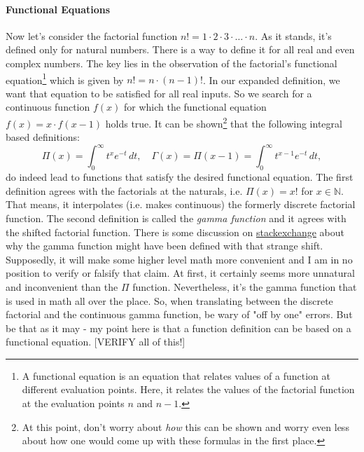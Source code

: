 


\paragraph{Functional Equations}
Now let's consider the factorial function $n! = 1 \cdot 2 \cdot 3 \cdot \ldots \cdot n$. As it stands, it's defined only for natural numbers. There is a way to define it for all real and even complex numbers. The key lies in the observation of the factorial's functional equation\footnote{A functional equation is an equation that relates values of a function at different evaluation points. Here, it relates the values of the factorial function at the evaluation points $n$ and $n-1$.} which is given by $n! = n \cdot (n-1)!$. In our expanded definition, we want that equation to be satisfied for all real inputs. So we search for a continuous function $f(x)$ for which the functional equation $f(x) = x \cdot f(x-1)$ holds true. It can be shown\footnote{At this point, don't worry about \emph{how} this can be shown and worry even less about how one would come up with these formulas in the first place.} that the following integral based definitions:
\begin{equation}
\Pi(x)    = \int_0^\infty t^x e^{-t} \, dt, \quad
\Gamma(x) = \Pi(x-1) = \int_0^\infty t^{x-1} e^{-t} \, dt,
\end{equation}
do indeed lead to functions that satisfy the desired functional equation. The first definition agrees with the factorials at the naturals, i.e. $\Pi(x) = x!$ for $x \in \mathbb{N}$. That means, it interpolates (i.e. makes continuous) the formerly discrete factorial function. The second definition is called the \emph{gamma function} and it agrees with the shifted factorial function. There is some discussion on \href{https://math.stackexchange.com/questions/1362523/why-is-the-gamma-function-off-by-1-from-the-factorial}{stackexchange} about why the gamma function might have been defined with that strange shift. Supposedly, it will make some higher level math more convenient and I am in no position to verify or falsify that claim. At first, it certainly seems more unnatural and inconvenient than the $\Pi$ function. Nevertheless, it's the gamma function that is used in math all over the place. So, when translating between the discrete factorial and the continuous gamma function, be wary of "off by one" errors. But be that as it may - my point here is that a function definition can be based on a functional equation. 
[VERIFY all of this!]


